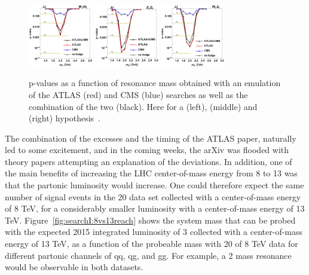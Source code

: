 \begin{figure}[h!] 
    \centering
    \includegraphics[width=0.25\textwidth]{figures/analysis/search1/misc/CMS_ATLAS_BulkWW_JJ_dijetfit_p.png}
    \includegraphics[width=0.25\textwidth]{figures/analysis/search1/misc/CMS_ATLAS_BulkZZ_JJ_dijetfit_p.png}
    \includegraphics[width=0.25\textwidth]{figures/analysis/search1/misc/CMS_ATLAS_WZ_JJ_dijetfit_p.png}
    \caption{p-values as a function of resonance mass obtained with an emulation of the ATLAS (red) and CMS (blue) searches as well as the combination of the two (black). Here for a \PW\PW (left), \PW\PZ (middle) and \PZ\PZ (right) hypothesis~\cite{Dias:2015mhm}.}
    \label{fig:searchI:8tevcombo}
\end{figure}
The combination of the excesses and the timing of the ATLAS paper, naturally led to some excitement, and in the coming weeks, the arXiv was flooded with theory papers attempting an explanation of the deviations.\newline
In addition, one of the main benefits of increasing the LHC center-of-mass energy from 8 to 13 \TeV was that the partonic luminosity would increase.
One could therefore expect the same number of signal events in the 20 \fbinv data set collected with a center-of-mass energy of 8 TeV, for a considerably smaller luminosity with a center-of-mass energy of 13 TeV. Figure~\ref{fig:searchI:8vs13reach} shows the system mass that can be probed with the expected 2015 integrated luminosity of 3 \fbinv collected with a center-of-mass energy of 13 TeV, as a function of the probeable mass with 20 \fbinv of 8 TeV data for different partonic channels of qq, qg, and gg. For example, a 2 \TeV mass resonance would be observable in both datasets.
